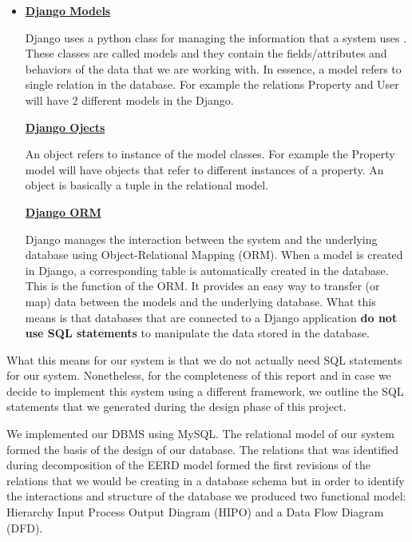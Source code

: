 \documentclass[12pt,a4paper]{report}
\begin{document}
\begin{itemize}

\item \textbf{\underline{Django Models}} \par
Django uses a python class for managing the information that a system uses \cite{dj}. 
These classes are called models and they contain the fields/attributes and behaviors of the data that we are working with. In essence, a model refers to single relation in the database. For example the relations Property and User will have 2 different models in the Django. 

\textbf{\underline{Django Ojects}} \par 
An object refers to instance of the model classes. For example the Property model will have objects that refer to different instances of a property. An object is basically a tuple in the relational model. \cite{DJ2} 

\textbf{\underline{Django ORM}} \par
Django manages the interaction between the system and the underlying database using Object-Relational Mapping (ORM). When a model is created in Django, a corresponding table is automatically created in the database. This is the function of the ORM. It provides an easy way to transfer (or map) data between the models and the underlying database. What this means is that databases that are connected to a Django application \textbf{do not use SQL statements} to manipulate the data stored in the database. \par 

\end{itemize}

What this means for our system is that we do not actually need SQL statements for our system. Nonetheless, for the completeness of this report and in case we decide to implement this system using a different framework, we outline the SQL statements that we generated during the design phase of this project.  \par 

We implemented our DBMS using MySQL. The relational model of our system formed the basis of the design of our database. The relations that was identified during decomposition of the EERD model formed the first revisions of the relations that we would be creating in a database schema but in order to identify the interactions and structure of the database we produced two functional model: Hierarchy Input Process Output Diagram (HIPO) and a Data Flow Diagram (DFD).
\end{document}
